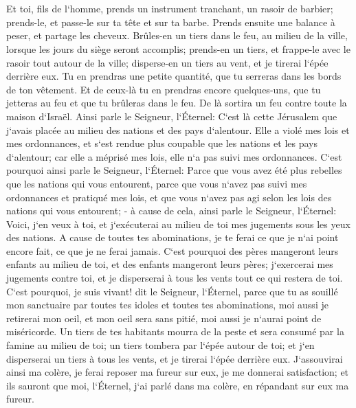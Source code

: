 \chapter{}

\verse Et toi, fils de l`homme, prends un instrument tranchant, un rasoir de barbier; prends-le, et passe-le sur ta tête et sur ta barbe. Prends ensuite une balance à peser, et partage les cheveux. 
\verse Brûles-en un tiers dans le feu, au milieu de la ville, lorsque les jours du siège seront accomplis; prends-en un tiers, et frappe-le avec le rasoir tout autour de la ville; disperse-en un tiers au vent, et je tirerai l`épée derrière eux. 
\verse Tu en prendras une petite quantité, que tu serreras dans les bords de ton vêtement. 
\verse Et de ceux-là tu en prendras encore quelques-uns, que tu jetteras au feu et que tu brûleras dans le feu. De là sortira un feu contre toute la maison d`Israël. 
\verse Ainsi parle le Seigneur, l`Éternel: C`est là cette Jérusalem que j`avais placée au milieu des nations et des pays d`alentour. 
\verse Elle a violé mes lois et mes ordonnances, et s`est rendue plus coupable que les nations et les pays d`alentour; car elle a méprisé mes lois, elle n`a pas suivi mes ordonnances. 
\verse C`est pourquoi ainsi parle le Seigneur, l`Éternel: Parce que vous avez été plus rebelles que les nations qui vous entourent, parce que vous n`avez pas suivi mes ordonnances et pratiqué mes lois, et que vous n`avez pas agi selon les lois des nations qui vous entourent; - 
\verse à cause de cela, ainsi parle le Seigneur, l`Éternel: Voici, j`en veux à toi, et j`exécuterai au milieu de toi mes jugements sous les yeux des nations. 
\verse A cause de toutes tes abominations, je te ferai ce que je n`ai point encore fait, ce que je ne ferai jamais. 
\verse C`est pourquoi des pères mangeront leurs enfants au milieu de toi, et des enfants mangeront leurs pères; j`exercerai mes jugements contre toi, et je disperserai à tous les vents tout ce qui restera de toi. 
\verse C`est pourquoi, je suis vivant! dit le Seigneur, l`Éternel, parce que tu as souillé mon sanctuaire par toutes tes idoles et toutes tes abominations, moi aussi je retirerai mon oeil, et mon oeil sera sans pitié, moi aussi je n`aurai point de miséricorde. 
\verse Un tiers de tes habitants mourra de la peste et sera consumé par la famine au milieu de toi; un tiers tombera par l`épée autour de toi; et j`en disperserai un tiers à tous les vents, et je tirerai l`épée derrière eux. 
\verse J`assouvirai ainsi ma colère, je ferai reposer ma fureur sur eux, je me donnerai satisfaction; et ils sauront que moi, l`Éternel, j`ai parlé dans ma colère, en répandant sur eux ma fureur. 
